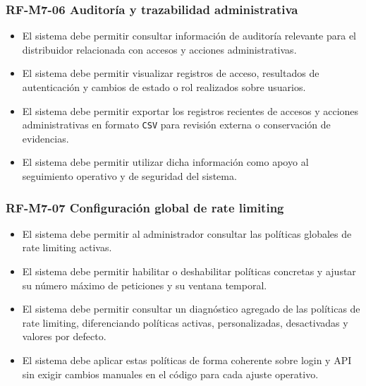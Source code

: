 \vspace{-0.75em}
\subsubsection{RF-M7-06 Auditoría y trazabilidad administrativa}
\vspace{-1em}

\begin{itemize}
    \item El sistema debe permitir consultar información de auditoría relevante para el distribuidor relacionada con accesos y acciones administrativas.
    \item El sistema debe permitir visualizar registros de acceso, resultados de autenticación y cambios de estado o rol realizados sobre usuarios.
    \item El sistema debe permitir exportar los registros recientes de accesos y acciones administrativas en formato \texttt{CSV} para revisión externa o conservación de evidencias.
    \item El sistema debe permitir utilizar dicha información como apoyo al seguimiento operativo y de seguridad del sistema.
\end{itemize}

\vspace{-0.75em}
\subsubsection{RF-M7-07 Configuración global de rate limiting}
\vspace{-1em}

\begin{itemize}
    \item El sistema debe permitir al administrador consultar las políticas globales de rate limiting activas.
    \item El sistema debe permitir habilitar o deshabilitar políticas concretas y ajustar su número máximo de peticiones y su ventana temporal.
    \item El sistema debe permitir consultar un diagnóstico agregado de las políticas de rate limiting, diferenciando políticas activas, personalizadas, desactivadas y valores por defecto.
    \item El sistema debe aplicar estas políticas de forma coherente sobre login y API sin exigir cambios manuales en el código para cada ajuste operativo.
\end{itemize}

\vspace{-0.75em}

